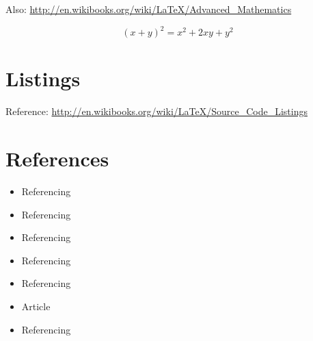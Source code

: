 Also: \url{http://en.wikibooks.org/wiki/LaTeX/Advanced_Mathematics}

\begin{equation}
  (x + y)^2 = x^2 + 2xy + y^2
  \label{eq:LABEL_EQ_1}
\end{equation}

\section{Listings}\label{sec:LABEL_CHP_3_SEC_D}
Reference: \url{http://en.wikibooks.org/wiki/LaTeX/Source_Code_Listings}



\section{References}\label{sec:LABEL_CHP_3_SEC_E}
\begin{itemize}
  \item Referencing 
  \item Referencing 
  \item Referencing 
  \item Referencing 
  \item Referencing 
  \item Article \cite{art:REF_ART_1}
  \item Referencing 
\end{itemize}